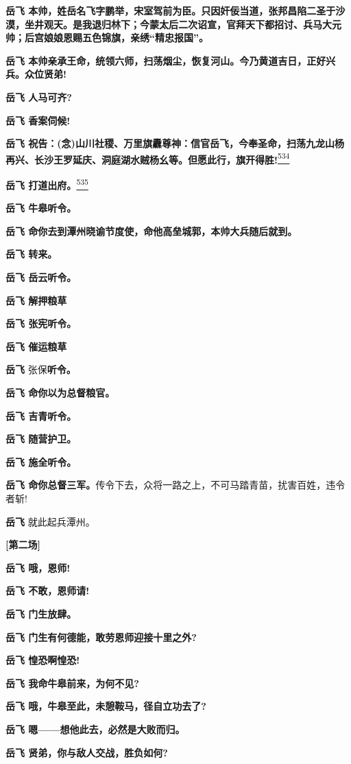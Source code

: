 \textbf{岳飞
本帅，姓岳名飞字鹏举，宋室驾前为臣。只因奸佞当道，张邦昌陷二圣于沙漠，坐井观天。是我退归林下；今蒙太后二次诏宣，官拜天下都招讨、兵马大元帅；后宫娘娘恩赐五色锦旗，亲绣``精忠报国''。}

\textbf{岳飞
本帅亲承王命，统领六师，扫荡烟尘，恢复河山。今乃黄道吉日，正好兴兵。众位贤弟!}

\textbf{岳飞 人马可齐?}

\textbf{岳飞 香案伺候!}

\textbf{岳飞
祝告：(念)山川社稷、万里旗纛尊神：信官岳飞，今奉圣命，扫荡九龙山杨再兴、长沙王罗延庆、洞庭湖水贼杨幺等。但愿此行，旗开得胜!}\protect\hyperlink{fn534}{\textsuperscript{534}}

\textbf{岳飞 打道出府。}\protect\hyperlink{fn535}{\textsuperscript{535}}

\textbf{岳飞 牛皋听令。}

\textbf{岳飞 命你去到潭州晓谕节度使，命他高垒城郭，本帅大兵随后就到。}

\textbf{岳飞 转来。}

\textbf{岳飞 岳云听令。}

\textbf{岳飞 解押粮草}

\textbf{岳飞 张宪听令。}

\textbf{岳飞 催运粮草}

\textbf{岳飞} 张保\textbf{听令。}

\textbf{岳飞 命你以为总督粮官。}

\textbf{岳飞 吉青听令。}

\textbf{岳飞 随营护卫。}

\textbf{岳飞 施全听令。}

\textbf{岳飞
命你总督三军。}传令下去，众将一路之上，不可马踏青苗，扰害百姓，违令者斩!

\textbf{岳飞} 就此起兵潭州。

\textbf{{[}第二场{]}}

\textbf{岳飞 哦，恩师!}

\textbf{岳飞 不敢，恩师请!}

\textbf{岳飞 门生放肆。}

\textbf{岳飞 门生有何德能，敢劳恩师迎接十里之外?}

\textbf{岳飞 惶恐啊惶恐!}

\textbf{岳飞 我命牛皋前来，为何不见?}

\textbf{岳飞 哦，牛皋至此，未憩鞍马，径自立功去了?}

\textbf{岳飞 嗯------想他此去，必然是大败而归。}

\textbf{岳飞 贤弟，你与敌人交战，胜负如何?}

